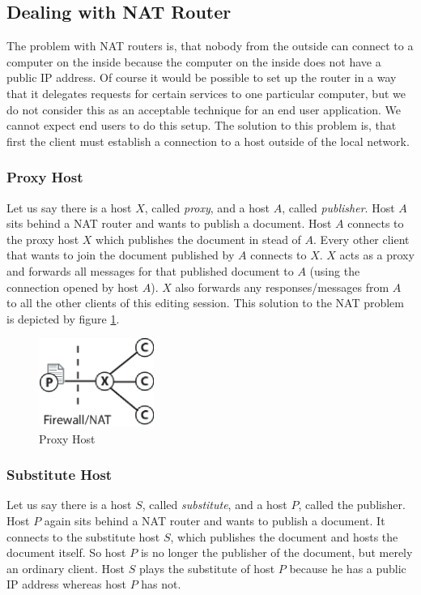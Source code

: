 \subsection{Dealing with NAT Router}
The problem with NAT routers is, that nobody from the outside can connect to a computer on the inside because the computer on the inside does not have a public IP address. Of course it would be possible to set up the router in a way that it delegates requests for certain services to one particular computer, but we do not consider this as an acceptable technique for an end user application. We cannot expect end users to do this setup. The solution to this problem is, that first the client must establish a connection to a host outside of the local network. 

\subsubsection{Proxy Host}
Let us say there is a host $X$, called \emph{proxy}, and a host $A$, called \emph{publisher}. Host $A$ sits behind a NAT router and wants to publish a document. Host $A$ connects to the proxy host $X$ which publishes the document in stead of $A$. Every other client that wants to join the document published by $A$ connects to $X$. $X$ acts as a proxy and forwards all messages for that published document to $A$ (using the connection opened by host $A$). $X$ also forwards any responses/messages from $A$ to all the other clients of this editing session. This solution to the NAT problem is depicted by figure \ref{fig:proxy}.

\begin{figure}[H]
 \centering
 \includegraphics[width=3.8cm,height=2.9cm]{../../images/net_proxy.eps}
 \caption{Proxy Host}
 \label{fig:proxy}
\end{figure}

\subsubsection{Substitute Host}
Let us say there is a host $S$, called \emph{substitute}, and a host $P$, called the publisher. Host $P$ again sits behind a NAT router and wants to publish a document. It connects to the substitute host $S$, which publishes the document and hosts the document itself. So host $P$ is no longer the publisher of the document, but merely an ordinary client. Host $S$ plays the substitute of host $P$ because he has a public IP address whereas host $P$ has not.

